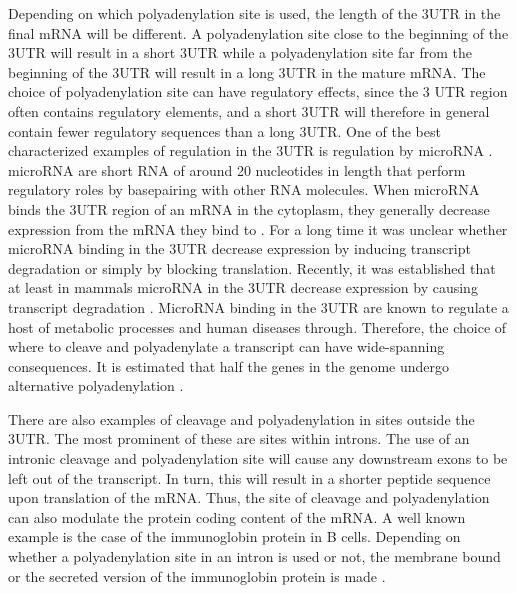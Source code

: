 Depending on which polyadenylation site is used, the length of the 3\ppp UTR in the
final mRNA will be different. A polyadenylation site close to the beginning of the
3\ppp UTR will result in a short 3\ppp UTR while a polyadenylation site far from the
beginning of the 3\ppp UTR will result in a long 3\ppp UTR in the mature mRNA.
The choice of polyadenylation site can have regulatory effects, since the 3\ppp
UTR region often contains regulatory elements, and a short 3\ppp UTR will
therefore in general contain fewer regulatory sequences than a long 3\ppp UTR.
One of the best characterized examples of regulation in the 3\ppp UTR is
regulation by microRNA \cite{digiammartino_mechanisms_2011}. microRNA are short
RNA of around 20 nucleotides in length that perform regulatory roles by
basepairing with other RNA molecules. When microRNA binds the 3\ppp UTR region
of an mRNA in the cytoplasm, they generally decrease expression from the mRNA
they bind to \cite{bartel_micrornas:_2004}. For a long time it was unclear
whether microRNA binding in the 3\ppp UTR decrease expression by inducing
transcript degradation or simply by blocking translation. Recently, it was
established that at least in mammals microRNA in the 3\ppp UTR decrease
expression by causing transcript degradation \cite{huntzinger_gene_2011}.
MicroRNA binding in the 3\ppp UTR are known to regulate a host of metabolic
processes and human diseases through\cite{huang_biological_2010}. Therefore,
the choice of where to cleave and polyadenylate a transcript can have
wide-spanning consequences. It is estimated that half the genes in the genome
undergo alternative polyadenylation \cite{tian_large-scale_2005}.

There are also examples of cleavage and polyadenylation in sites outside the
3\ppp UTR. The most prominent of these are sites within introns. The use of an
intronic cleavage and polyadenylation site will cause any downstream exons to be left
out of the transcript. In turn, this will result in a shorter peptide sequence
upon translation of the mRNA. Thus, the site of cleavage and polyadenylation
can also modulate the protein coding content of the mRNA. A well known example
is the case of the immunoglobin protein in B cells. Depending on whether a
polyadenylation site in an intron is used or not, the membrane bound or the secreted
version of the immunoglobin protein is made \cite{peterson_regulated_1989}.

